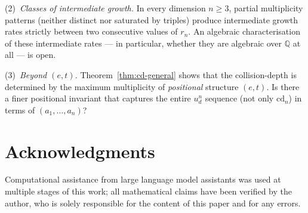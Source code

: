 \documentclass[11pt,a4paper]{article}
\theoremstyle{remark}
\theoremstyle{plain}
\begin{document}
(2)~\emph{Classes of intermediate growth.}  In every dimension
$n \ge 3$, partial multiplicity patterns (neither distinct nor
saturated by triples) produce intermediate growth rates strictly
between two consecutive values of $r_n$.  An algebraic
characterisation of these intermediate rates --- in particular,
whether they are algebraic over $\mathbb{Q}$ at all --- is open.

(3)~\emph{Beyond $(e, t)$.}  Theorem~\ref{thm:cd-general} shows that
the collision-depth is determined by the maximum multiplicity of
\emph{positional} structure $(e, t)$.  Is there a finer
positional invariant that captures the entire $u_d^n$ sequence (not
only $\mathrm{cd}_n$) in terms of $(a_1, \ldots, a_n)$?

\section*{Acknowledgments}

Computational assistance from large language model assistants was used
at multiple stages of this work; all mathematical claims have been
verified by the author, who is solely responsible for the content of
this paper and for any errors.
\end{document}
